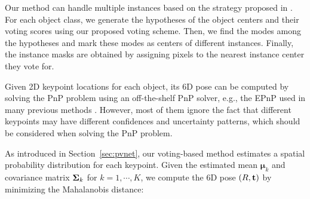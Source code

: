 \documentclass[10pt,twocolumn,letterpaper]{article}
\begin{document}
Our method can handle multiple instances based on the strategy proposed in \cite{xiang2017posecnn, papandreou2018personlab}. For each object class, we generate the hypotheses of the object centers and their voting scores using our proposed voting scheme.
Then, we find the modes among the hypotheses and mark these modes as centers of different instances. Finally, the instance masks are obtained by assigning pixels to the nearest instance center they vote for.

Given 2D keypoint locations for each object, its 6D pose can be computed by solving the PnP problem using an off-the-shelf PnP solver, e.g., the EPnP \cite{lepetit2009epnp} used in many previous methods \cite{tekin2018real,rad2017bb8}.
However, most of them ignore the fact that different keypoints may have different confidences and uncertainty patterns, which should be considered when solving the PnP problem.      


As introduced in Section~\ref{sec:pvnet}, our voting-based method estimates a spatial probability distribution for each keypoint. Given the estimated mean ${\boldsymbol \mu_k}$ and covariance matrix ${\bf \Sigma}_k$ for $k=1,\cdots,K$, we compute the 6D pose $(R,{\bf t})$ by minimizing the Mahalanobis distance:
\end{document}
